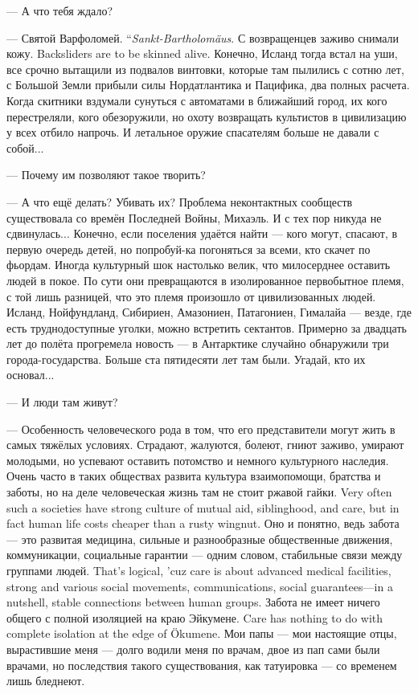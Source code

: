 --- А что тебя ждало?

{--- Святой Варфоломей.}
{``\textit{Sankt-Bartholomäus}.}
{С возвращенцев заживо снимали кожу.}
{Backsliders are to be skinned alive.}
Конечно, Исланд тогда встал на уши, все срочно вытащили из подвалов винтовки, которые там пылились с сотню лет, с Большой Земли прибыли силы Нордатлантика и Пацифика, два полных расчета.
Когда скитники вздумали сунуться с автоматами в ближайший город, их кого перестреляли, кого обезоружили, но охоту возвращать культистов в цивилизацию у всех отбило напрочь.
И летальное оружие спасателям больше не давали с собой...

--- Почему им позволяют такое творить?

--- А что ещё делать?
Убивать их?
Проблема неконтактных сообществ существовала со времён Последней Войны, Михаэль.
И с тех пор никуда не сдвинулась...
Конечно, если поселения удаётся найти --- кого могут, спасают, в первую очередь детей, но попробуй-ка погоняться за всеми, кто скачет по фьордам.
Иногда культурный шок настолько велик, что милосерднее оставить людей в покое.
По сути они превращаются в изолированное первобытное племя, с той лишь разницей, что это племя произошло от цивилизованных людей.
Исланд, Нойфундланд, Сибириен, Амазониен, Патагониен, Гималайа --- везде, где есть труднодоступные уголки, можно встретить сектантов.
Примерно за двадцать лет до полёта прогремела новость --- в Антарктике случайно обнаружили три города-государства.
Больше ста пятидесяти лет там были.
Угадай, кто их основал...

--- И люди там живут?

--- Особенность человеческого рода в том, что его представители могут жить в самых тяжёлых условиях.
Страдают, жалуются, болеют, гниют заживо, умирают молодыми, но успевают оставить потомство и немного культурного наследия.
{Очень часто в таких обществах развита культура взаимопомощи, братства и заботы, но на деле человеческая жизнь там не стоит ржавой гайки.}
{Very often such a societies have strong culture of mutual aid, siblinghood, and care, but in fact human life costs cheaper than a rusty wingnut.}
{Оно и понятно, ведь забота --- это развитая медицина, сильные и разнообразные общественные движения, коммуникации, социальные гарантии --- одним словом, стабильные связи между группами людей.}
{That's logical, 'cuz care is about advanced medical facilities, strong and various social movements, communications, social guarantees---in a nutshell, stable connections between human groups.}
{Забота не имеет ничего общего с полной изоляцией на краю Эйкумене.}
{Care has nothing to do with complete isolation at the edge of Ökumene.}
Мои папы --- мои настоящие отцы, вырастившие меня --- долго водили меня по врачам, двое из пап сами были врачами, но последствия такого существования, как татуировка --- со временем лишь бледнеют.

